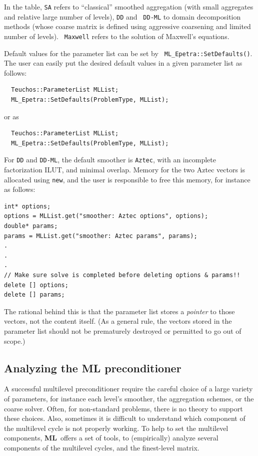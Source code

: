 \documentclass{article}[11pt]
\newcommand{\ML}     {{\bf ML}}
\begin{document}
%
In the table, {\tt SA} refers to ``classical'' smoothed aggregation (with
small aggregates and relative large number of levels), {\tt DD} and {\tt
  DD-ML} to domain decomposition methods (whose coarse matrix is defined
using aggressive coarsening and limited number of levels).  {\tt
  Maxwell} refers to the solution of Maxwell's equations. 

Default values for the parameter list can be set by {\tt
  ML\_Epetra::SetDefaults()}.  The user can easily put the desired
default values in a given parameter list as follows:
\begin{verbatim}
  Teuchos::ParameterList MLList;
  ML_Epetra::SetDefaults(ProblemType, MLList);
\end{verbatim}
or as
\begin{verbatim}
  Teuchos::ParameterList MLList;
  ML_Epetra::SetDefaults(ProblemType, MLList);
\end{verbatim}

For {\tt DD} and {\tt DD-ML}, the default smoother is {\tt Aztec},
with an incomplete factorization ILUT, and minimal overlap. 
Memory for the two {\sc Aztec} vectors is allocated using {\tt new}, and the
user is responsible to free this memory, for instance as follows:
\begin{verbatim}
int* options;
options = MLList.get("smoother: Aztec options", options);
double* params;
params = MLList.get("smoother: Aztec params", params);
.
.
.
// Make sure solve is completed before deleting options & params!!
delete [] options;
delete [] params;
\end{verbatim}
The rational behind this is that the parameter list stores a {\sl pointer} to those
vectors, not the content itself. (As a general rule, the vectors stored in the
parameter list should not
be prematurely destroyed or permitted to go out of scope.)
%


\subsection{Analyzing the ML preconditioner}
\label{sec:MLP:analyze}

A successful multilevel preconditioner require the careful choice
of a large variety of parameters, for instance 
each level's smoother, the aggregation schemes, or the coarse solver.
Often, for non-standard problems, there is no theory to support these choices.
Also, sometimes it is difficult to understand which component of the
multilevel cycle is not properly working. To help to set the multilevel
components, \ML~offers a set of tools, to (empirically)
analyze several components of the multilevel cycles, and the finest-level
matrix.
\end{document}
